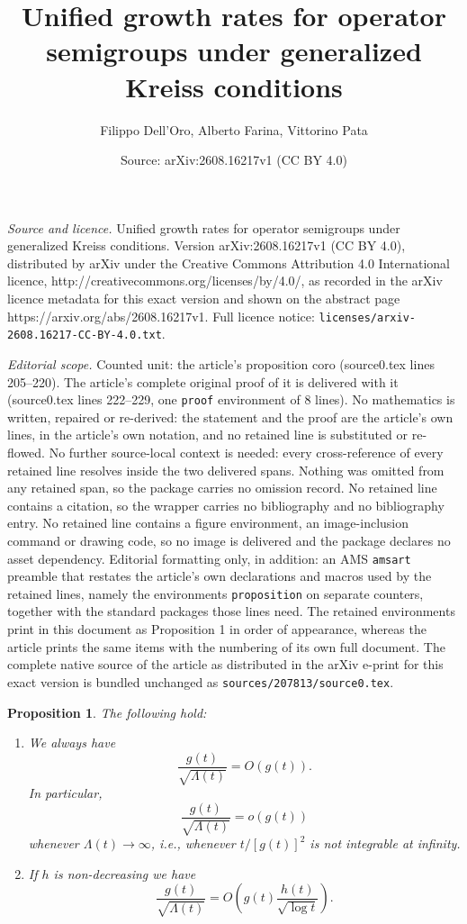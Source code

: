 \documentclass[10pt,a4paper]{amsart}
\title{Unified growth rates for operator semigroups under generalized Kreiss conditions}
\author{Filippo Dell'Oro, Alberto Farina, Vittorino Pata}
\date{Source: arXiv:2608.16217v1 (CC BY 4.0)}
\newtheorem{proposition}{Proposition}
\begin{document}
\maketitle

\noindent\emph{Source and licence.} Unified growth rates for operator semigroups under generalized Kreiss conditions. Version arXiv:2608.16217v1 (CC BY 4.0), distributed by arXiv under the Creative Commons Attribution 4.0 International licence, http://creativecommons.org/licenses/by/4.0/, as recorded in the arXiv licence metadata for this exact version and shown on the abstract page https://arxiv.org/abs/2608.16217v1. Full licence notice: \texttt{licenses/arxiv-2608.16217-CC-BY-4.0.txt}.\par\smallskip

\noindent\textit{Editorial scope.} Counted unit: the article's proposition coro (source0.tex lines 205--220). The article's complete original proof of it is delivered with it (source0.tex lines 222--229, one \texttt{proof} environment of 8 lines). No mathematics is written, repaired or re-derived: the statement and the proof are the article's own lines, in the article's own notation, and no retained line is substituted or re-flowed.  No further source-local context is needed: every cross-reference of every retained line resolves inside the two delivered spans.  Nothing was omitted from any retained span, so the package carries no omission record.  No retained line contains a citation, so the wrapper carries no bibliography and no bibliography entry.  No retained line contains a figure environment, an image-inclusion command or drawing code, so no image is delivered and the package declares no asset dependency.  Editorial formatting only, in addition: an AMS \texttt{amsart} preamble that restates the article's own declarations and macros used by the retained lines, namely the environments \texttt{proposition} on separate counters, together with the standard packages those lines need.  The retained environments print in this document as Proposition 1 in order of appearance, whereas the article prints the same items with the numbering of its own full document.  The complete native source of the article as distributed in the arXiv e-print for this exact version is bundled unchanged as \texttt{sources/207813/source0.tex}.
\begin{proposition}
\label{coro}
The following hold:
\begin{enumerate}
\item[\rm (i)] We always have
$$\frac{g(t)}{\sqrt{\Lambda(t)}}=O(g(t)).$$
In particular,
$$\frac{g(t)}{\sqrt{\Lambda(t)}}=o(g(t))$$
whenever $\Lambda(t)\to\infty$, i.e., whenever $t/[g(t)]^2$ is not integrable at infinity.
\vskip2mm
\item[\rm (ii)] If $h$ is non-decreasing we have
$$
\frac{g(t)}{\sqrt{\Lambda(t)}} = O\left(g(t)\frac{h(t)}{\sqrt{\log t}}\right).
$$
\end{enumerate}
\end{proposition}
\end{document}
